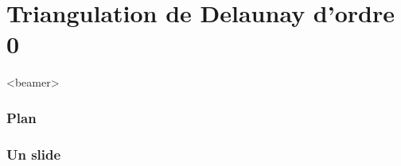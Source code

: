 \section{Triangulation de Delaunay d'ordre 0}

  \begin{frame}<beamer>
    \frametitle{Plan}
    \tableofcontents[currentsection]
  \end{frame}

\begin{frame}
  	\frametitle{Un slide}


\end{frame}
